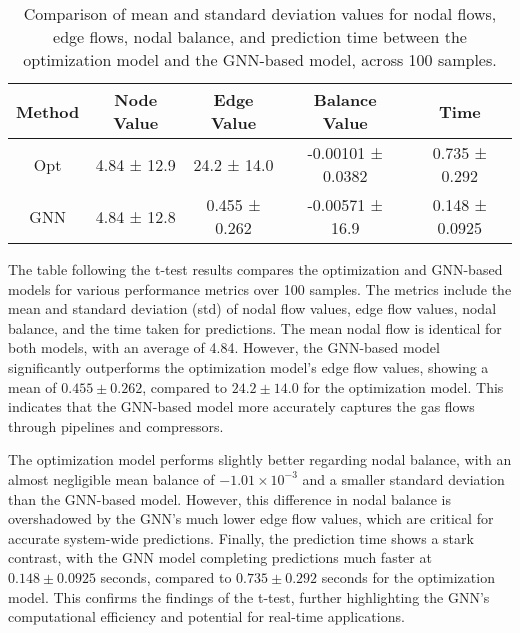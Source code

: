 %
\begin{table}
\centering
\begin{tabular}{|c|c|c|c|c|}
\hline
Method & Node Value & Edge Value & Balance Value & Time \\ \hline
Opt & 4.84 ± 12.9 & 24.2 ± 14.0 & -0.00101 ± 0.0382 & 0.735 ± 0.292 \\ \hline
GNN & 4.84 ± 12.8 & 0.455 ± 0.262 & -0.00571 ± 16.9 & 0.148 ± 0.0925 \\ \hline
\end{tabular}
\caption{Comparison of mean and standard deviation values for nodal flows, edge flows, nodal balance, and prediction time between the optimization model and the GNN-based model, across 100 samples.}
\label{tab:dummy_base_results}
\end{table}

The table following the t-test results compares the optimization and GNN-based models for various performance metrics over 100 samples. The metrics include the mean and standard deviation (std) of nodal flow values, edge flow values, nodal balance, and the time taken for predictions. The mean nodal flow is identical for both models, with an average of 4.84. However, the GNN-based model significantly outperforms the optimization model's edge flow values, showing a mean of $0.455 \pm 0.262$, compared to $24.2 \pm 14.0$ for the optimization model. This indicates that the GNN-based model more accurately captures the gas flows through pipelines and compressors.

The optimization model performs slightly better regarding nodal balance, with an almost negligible mean balance of $-1.01 \times 10^{-3}$ and a smaller standard deviation than the GNN-based model. However, this difference in nodal balance is overshadowed by the GNN's much lower edge flow values, which are critical for accurate system-wide predictions. Finally, the prediction time shows a stark contrast, with the GNN model completing predictions much faster at $0.148 \pm 0.0925$ seconds, compared to $0.735 \pm 0.292$ seconds for the optimization model. This confirms the findings of the t-test, further highlighting the GNN's computational efficiency and potential for real-time applications.






